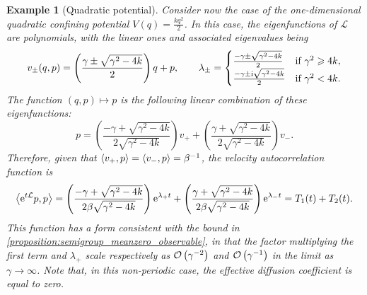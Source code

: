\documentclass[11pt,a4paper]{article}
\newcommand{\e}{\mathrm{e}}
\newcommand{\imag}{\mathrm{i}}
\renewcommand{\d}{\mathrm d}
\theoremstyle{plain}
\newtheorem{example}{Example}[section]
\numberwithin{equation}{section}
\renewcommand{\geq}{\geqslant}
\begin{document}
\begin{example}
    [Quadratic potential]
    \label{example:quadratic}
    Consider now the case of the one-dimensional quadratic confining potential $V(q) = \frac{k q^2}{2}$.
    In this case, the eigenfunctions of $\mathcal L$ are polynomials,
    with the linear ones and associated eigenvalues being
    \[
        v_{\pm}(q, p) =
        \left( \frac{\gamma \pm \sqrt{\gamma^2 - 4k}}{2} \right) q + p, \\
        \qquad
        \lambda_{\pm} =
        \begin{cases}
            \frac{- \gamma \pm \sqrt{\gamma^2 - 4k}}{2} & \text{if $\gamma^2 \geq 4k$}, \\
            \frac{- \gamma \pm \imag \sqrt{\gamma^2 - 4k}}{2} & \text{if $\gamma^2 < 4k$}.
        \end{cases}
    \]
    The function $(q, p) \mapsto p$ is the following linear combination of these eigenfunctions:
    \[
        p =
        \left( \frac{-\gamma + \sqrt{\gamma^2 - 4k}}{2 \sqrt{\gamma^2 - 4k}} \right) v_+
        + \left( \frac{\gamma + \sqrt{\gamma^2 - 4k}}{2 \sqrt{\gamma^2 - 4k}} \right) v_-.
    \]
    Therefore, given that $\ip{v_+}{p} = \ip{v_-}{p} = \beta^{-1}$,
    the velocity autocorrelation function is
    \[
        \ip{\e^{t \mathcal L}p}{p} =
        \left( \frac{-\gamma + \sqrt{\gamma^2 - 4k}}{2 \beta \sqrt{\gamma^2 - 4k}} \right) \e^{\lambda_+ t} +
        \left( \frac{\gamma + \sqrt{\gamma^2 - 4k}}{2 \beta \sqrt{\gamma^2 - 4k}} \right) \e^{\lambda_- t} = T_1(t) + T_2(t).
    \]
    This function has a form consistent with the bound in \cref{proposition:semigroup_meanzero_observable},
    in that the factor multiplying the first term and $\lambda_+$ scale respectively as $\bigo{\gamma^{-2}}$ and $\bigo {\gamma^{-1}}$ in the limit as~$\gamma \to \infty$.
    Note that, in this non-periodic case, the effective diffusion coefficient is equal to zero.
\end{example}
\end{document}
